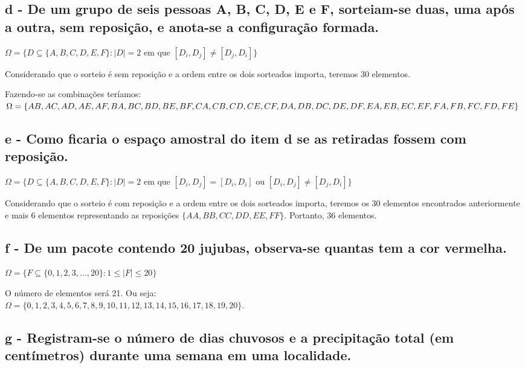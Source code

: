 \documentclass[12pt]{article}
\begin{document}
\subsection*{d - De um grupo de seis pessoas A, B, C, D, E e F, sorteiam-se duas, uma após a outra, sem reposição, e anota-se a configuração formada.}

$\Omega = \{D \subseteq \{A,B,C,D,E,F\}: |D|=2 \text{ em que } [D_i, D_j] \neq [D_j, D_i]\}$

Considerando que o sorteio é sem reposição e a ordem entre os dois sorteados importa, teremos 30 elementos.

Fazendo-se as combinações teríamos: \\
$\Omega = \{ AB, AC, AD, AE, AF, \\ BA, BC, BD, BE, BF, \\ CA, CB, CD, CE, CF, \\ DA, DB, DC, DE, DF, \\ EA, EB, EC, EF, \\ FA, FB, FC, FD, FE \}$

\subsection*{e - Como ficaria o espaço amostral do item d se as retiradas fossem com reposição.}

$\Omega = \{D \subseteq \{A,B,C,D,E,F\}: |D|=2 \text{ em que } [D_i, D_j] = [D_i, D_i] \text{ ou } [D_i, D_j] \neq [D_j, D_i]\}$

Considerando que o sorteio é com reposição e a ordem entre os dois sorteados importa, teremos os 30 elementos encontrados anteriormente e mais 6 elementos representando as reposições $\{ AA, BB, CC, DD, EE, FF\}$. Portanto, 36 elementos.

\subsection*{f - De um pacote contendo 20 jujubas, observa-se quantas tem a cor vermelha.}

$\Omega = \{F \subseteq \{0,1,2,3,...,20\}: 1 \leq |F| \leq 20\}$

O número de elementos será 21. Ou seja: \\

$\Omega = \{ 0,1,2,3,4,5,6,7,8,9,10,11,12,13,14,15,16,17,18,19,20\}$.

\subsection*{g - Registram-se o número de dias chuvosos e a precipitação total (em centímetros) durante uma semana em uma localidade.}
\end{document}
